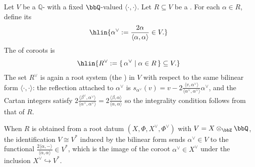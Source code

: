 \begin{definition} \label{definition:coroot_system_of_a_root_system_of_a_finite_dimensional_Q_vector_space_with_a_symmetric_bilinear_form}
Let $V$ be a  $\mathbb{Q}$- with a fixed $\bbQ$-valued  $\langle\cdot,\cdot\rangle$. Let $R \subseteq V$ be a .
For each $\alpha \in R$, define its 
$$\hlin{\alpha^\vee := \frac{2\alpha}{\langle \alpha, \alpha \rangle} \in V.}$$
The  of coroots is
$$\hlin{R^\vee := \{\, \alpha^\vee \mid \alpha \in R \,\} \subseteq V.}$$
The set $R^\vee$ is again a root system (the ) in $V$ with respect to the same bilinear form $\langle\cdot,\cdot\rangle$: the reflection attached to $\alpha^\vee$ is $s_{\alpha^\vee}(v) = v - 2\frac{\langle v,\alpha^\vee\rangle}{\langle\alpha^\vee,\alpha^\vee\rangle}\alpha^\vee$, and the Cartan integers satisfy $2\frac{\langle\beta^\vee,\alpha^\vee\rangle}{\langle\alpha^\vee,\alpha^\vee\rangle} = 2\frac{\langle\beta,\alpha\rangle}{\langle\alpha,\alpha\rangle}$ so the integrality condition follows from that of $R$.

When $R$ is obtained from a root datum $(X,\Phi,X^\vee,\Phi^\vee)$ with $V = X \otimes_{\bbZ} \bbQ$, the identification $V \cong V^\ast$ induced by the bilinear form sends $\alpha^\vee \in V$ to the functional $\frac{2\langle\alpha,-\rangle}{\langle\alpha,\alpha\rangle} \in V^\ast$, which is the image of the coroot $\alpha^\vee \in X^\vee$ under the inclusion $X^\vee \hookrightarrow V^\ast$.
\end{definition}